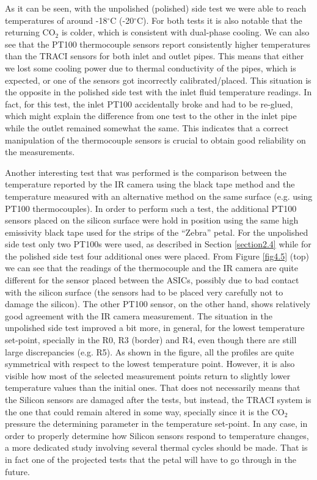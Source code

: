 		As it can be seen, with the unpolished (polished) side test we were able to reach temperatures of around -18$^{\circ}$C (-20$^{\circ}$C). For both tests it is also notable that the returning CO$_{2}$ is colder, which is consistent with dual-phase cooling. We can also see that the PT100 thermocouple sensors report consistently higher temperatures than the TRACI sensors for both inlet and outlet pipes. This means that either we lost some cooling power due to thermal conductivity of the pipes, which is expected, or one of the sensors got incorrectly calibrated/placed. This situation is the opposite in the polished side test with the inlet fluid temperature readings. In fact, for this test, the inlet PT100 accidentally broke and had to be re-glued, which might explain the difference from one test to the other in the inlet pipe while the outlet remained somewhat the same. This indicates that a correct manipulation of the thermocouple sensors is crucial to obtain good reliability on the measurements.
		
		Another interesting test that was performed is the comparison between the temperature reported by the IR camera using the black tape method and the temperature measured with an alternative method on the same surface (e.g. using PT100 thermocouples). In order to perform such a test, the additional PT100 sensors placed on the silicon surface were hold in position using the same high emissivity black tape used for the strips of the “Zebra” petal. For the unpolished side test only two PT100s were used, as described in Section \ref{section2.4} while for the polished side test four additional ones were placed. From Figure \ref{fig4.5} (top) we can see that the readings of the thermocouple and the IR camera are quite different for the sensor placed between the ASICs, possibly due to bad contact with the silicon surface (the sensors had to be placed very carefully not to damage the silicon). The other PT100 sensor, on the other hand, shows relatively good agreement with the IR camera measurement. The situation in the unpolished side test improved a bit more, in general, for the lowest temperature set-point, specially in the R0, R3 (border) and R4, even though there are still large discrepancies (e.g. R5). As shown in the figure, all the profiles are quite symmetrical with respect to the lowest temperature point. However, it is also visible how most of the selected measurement points return to slightly lower temperature values than the initial ones. That does not necessarily means that the Silicon sensors are damaged after the tests, but instead, the TRACI system is the one that could remain altered in some way, specially since it is the CO$_{2}$ pressure the determining parameter in the temperature set-point.
		In any case, in order to properly determine how Silicon sensors respond to temperature changes, a more dedicated study involving several thermal cycles should be made. That is in fact one of the projected tests that the petal will have to go through in the future.\bigskip	

